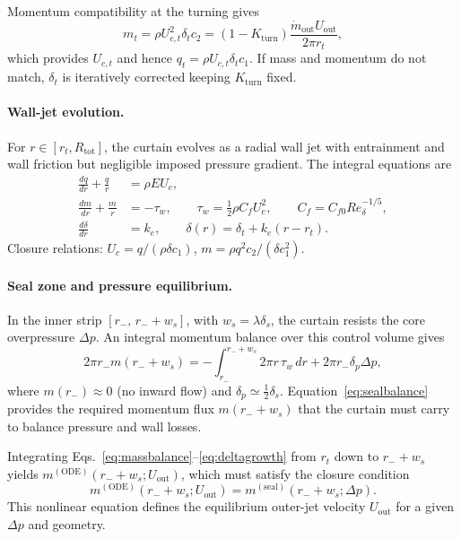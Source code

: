 \documentclass[11pt,a4paper]{article}
\begin{document}
Momentum compatibility at the turning gives
\begin{equation}
m_t = \rho U_{c,t}^2 \delta_t c_2 =
(1-K_{\mathrm{turn}})\frac{\dot m_{\mathrm{out}} U_{\mathrm{out}}}{2\pi r_t},
\end{equation}
which provides $U_{c,t}$ and hence $q_t = \rho U_{c,t} \delta_t c_1$.
If mass and momentum do not match, $\delta_t$ is iteratively corrected keeping $K_{\mathrm{turn}}$ fixed.

\paragraph{Wall-jet evolution.}
For $r \in [r_t, R_{\mathrm{tot}}]$, the curtain evolves as a radial wall jet with entrainment
and wall friction but negligible imposed pressure gradient. The integral equations are
\begin{align}
\frac{dq}{dr} + \frac{q}{r} &= \rho E U_c, \label{eq:massbalance}\\
\frac{dm}{dr} + \frac{m}{r} &= -\tau_w, \qquad
\tau_w = \tfrac12 \rho C_f U_c^2, \qquad C_f = C_{f0} Re_\delta^{-1/5}, \label{eq:mombalance}\\
\frac{d\delta}{dr} &= k_e, \qquad \delta(r) = \delta_t + k_e (r - r_t). \label{eq:deltagrowth}
\end{align}
Closure relations: $U_c = q / (\rho \delta c_1)$, $m = \rho q^2 c_2 / (\delta c_1^2)$.

\paragraph{Seal zone and pressure equilibrium.}
In the inner strip $[r_-,\, r_- + w_s]$, with $w_s = \lambda \delta_s$,
the curtain resists the core overpressure $\Delta p$.
An integral momentum balance over this control volume gives
\begin{equation}
2\pi r_- m(r_-+w_s)
= -\!\!\int_{r_-}^{r_-+w_s} 2\pi r\,\tau_w\,dr
+ 2\pi r_- \delta_p \Delta p,
\label{eq:sealbalance}
\end{equation}
where $m(r_-)\!\approx\!0$ (no inward flow) and $\delta_p\simeq\tfrac12\delta_s$.
Equation~\eqref{eq:sealbalance} provides the required momentum flux $m(r_-+w_s)$
that the curtain must carry to balance pressure and wall losses.

Integrating Eqs.~\eqref{eq:massbalance}--\eqref{eq:deltagrowth} from $r_t$ down to $r_-+w_s$
yields $m^{(\mathrm{ODE})}(r_-+w_s; U_{\mathrm{out}})$,
which must satisfy the closure condition
\begin{equation}
m^{(\mathrm{ODE})}(r_-+w_s; U_{\mathrm{out}})
= m^{(\mathrm{seal})}(r_-+w_s; \Delta p).
\label{eq:sealeq}
\end{equation}
This nonlinear equation defines the equilibrium outer-jet velocity $U_{\mathrm{out}}$
for a given $\Delta p$ and geometry.
\end{document}
